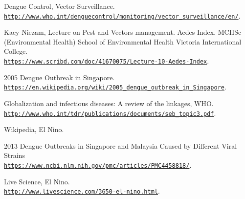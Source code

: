 \documentclass[11pt]{exam}
\begin{document}
\begin{thebibliography}{28}
Dengue Control, Vector Surveillance.
\\\texttt{\url{http://www.who.int/denguecontrol/monitoring/vector_surveillance/en/}}.

Kaey Niezam, Lecture on Pest and Vectors management. Aedes Index. MCHSc (Environmental Health) School of Environmental Health Victoria International College.
\\\texttt{\url{https://www.scribd.com/doc/41670075/Lecture-10-Aedes-Index}}.

2005 Dengue Outbreak in Singapore.
\\\texttt{\url{https://en.wikipedia.org/wiki/2005_dengue_outbreak_in_Singapore}}.

Globalization and infectious diseases: A review of the linkages, WHO.
\\\texttt{\url{http://www.who.int/tdr/publications/documents/seb_topic3.pdf}}.

Wikipedia, El Nino.

2013 Dengue Outbreaks in Singapore and Malaysia Caused by Different Viral Strains
\\\texttt{\url{https://www.ncbi.nlm.nih.gov/pmc/articles/PMC4458818/}}.

Live Science, El Nino.
\\\texttt{\url{http://www.livescience.com/3650-el-nino.html}}.


\end{thebibliography}
\end{document}
